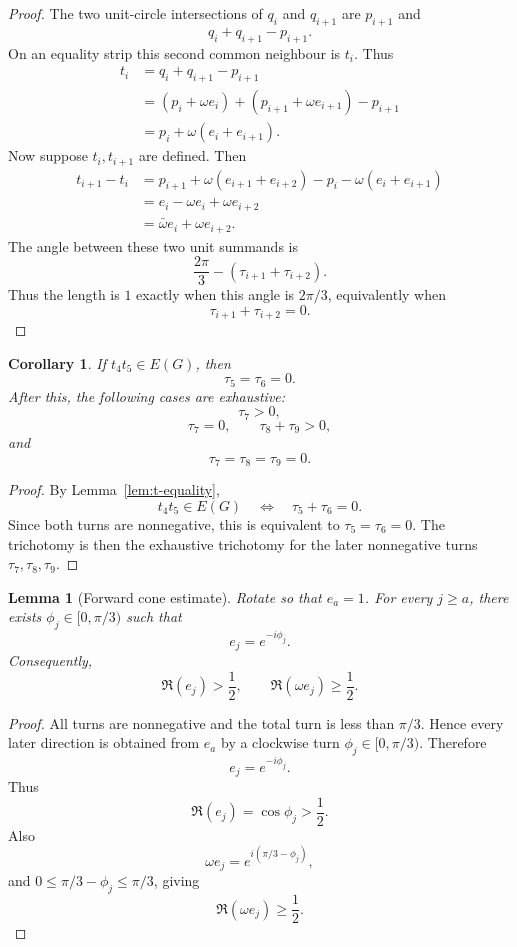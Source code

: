 \documentclass[11pt]{article}
\theoremstyle{plain}
\newtheorem{lemma}{Lemma}
\newtheorem{corollary}{Corollary}
\numberwithin{equation}{section}
\begin{document}
\begin{proof}
The two unit-circle intersections of $q_i$ and $q_{i+1}$ are $p_{i+1}$ and
\[
 q_i+q_{i+1}-p_{i+1}.
\]
On an equality strip this second common neighbour is $t_i$. Thus
\[
\begin{aligned}
 t_i&=q_i+q_{i+1}-p_{i+1}\\
 &=(p_i+\omega e_i)+(p_{i+1}+\omega e_{i+1})-p_{i+1}\\
 &=p_i+\omega(e_i+e_{i+1}).
\end{aligned}
\]
Now suppose $t_i,t_{i+1}$ are defined. Then
\[
\begin{aligned}
 t_{i+1}-t_i
 &=p_{i+1}+\omega(e_{i+1}+e_{i+2})-p_i-\omega(e_i+e_{i+1})\\
 &=e_i-\omega e_i+\omega e_{i+2}\\
 &=\bar\omega e_i+\omega e_{i+2}.
\end{aligned}
\]
The angle between these two unit summands is
\[
 \frac{2\pi}{3}-(\tau_{i+1}+\tau_{i+2}).
\]
Thus the length is $1$ exactly when this angle is $2\pi/3$, equivalently when
\[
 \tau_{i+1}+\tau_{i+2}=0.
\]
\end{proof}

\begin{corollary}\label{cor:t4t5}
If $t_4t_5\in E(G)$, then
\[
 \tau_5=\tau_6=0.
\]
After this, the following cases are exhaustive:
\[
 \tau_7>0,
\]
\[
 \tau_7=0,\qquad \tau_8+\tau_9>0,
\]
and
\[
 \tau_7=\tau_8=\tau_9=0.
\]
\end{corollary}

\begin{proof}
By Lemma~\ref{lem:t-equality},
\[
 t_4t_5\in E(G)
 \quad\Longleftrightarrow\quad
 \tau_5+\tau_6=0.
\]
Since both turns are nonnegative, this is equivalent to $\tau_5=\tau_6=0$. The trichotomy is then the exhaustive trichotomy for the later nonnegative turns $\tau_7,\tau_8,\tau_9$.
\end{proof}

\begin{lemma}[Forward cone estimate]\label{lem:cone}
Rotate so that $e_a=1$. For every $j\ge a$, there exists $\phi_j\in[0,\pi/3)$ such that
\[
 e_j=e^{-i\phi_j}.
\]
Consequently,
\[
 \Re(e_j)>\frac12,
 \qquad
 \Re(\omega e_j)\ge\frac12.
\]
\end{lemma}

\begin{proof}
All turns are nonnegative and the total turn is less than $\pi/3$. Hence every later direction is obtained from $e_a$ by a clockwise turn $\phi_j\in[0,\pi/3)$. Therefore
\[
 e_j=e^{-i\phi_j}.
\]
Thus
\[
 \Re(e_j)=\cos\phi_j>\frac12.
\]
Also
\[
 \omega e_j=e^{i(\pi/3-\phi_j)},
\]
and $0\le \pi/3-\phi_j\le \pi/3$, giving
\[
 \Re(\omega e_j)\ge\frac12.
\]
\end{proof}
\end{document}
